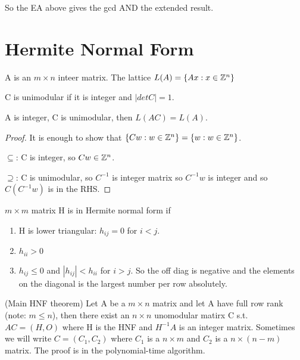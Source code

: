 So the EA above gives the gcd AND the extended result.

\section{Hermite Normal Form}


\begin{definition}
A is an $m\times n$ inteer matrix. The lattice $L(A) = \{Ax : x \in \mathbb Z^n\}$
\end{definition}
 
\begin{definition}
C is unimodular if it is integer and $|det C| = 1$.
\end{definition}


\begin{lemma}
A is integer, C is unimodular, then $L(AC) = L(A)$.
\end{lemma}
\begin{proof}
It is enough to show that $\{Cw : w \in \mathbb Z^n\} = \{w: w \in \mathbb Z^n\}$. 

$\subseteq$: C is integer, so $Cw \in \mathbb Z^n$.

$\supseteq$: C is unimodular, so $C^{-1}$ is integer matrix so $C^{-1}w$ is integer and so $C(C^{-1}w)$ is in the RHS.
\end{proof}

\begin{definition}
$m \times m$ matrix H is in Hermite normal form if 
\begin{enumerate}
	\item H is lower triangular: $h_{ij} = 0 $ for $i < j$.
	\item $h_{ii} > 0$
	\item $h_{ij} \leq 0$ and $|h_{ij}| < h_{ii}$ for $i>j$. So the off diag is negative and the elements on the diagonal is the largest number per row absolutely. 
\end{enumerate}
\end{definition}


\begin{theorem}(Main HNF theorem)
Let A be a $m \times n$ matrix and let A have full row rank (note: $m \leq n$), then there exist an $n \times n$ unomodular matirx C s.t.  $AC  = (H, O)$ where H is the HNF and $H^{-1}A$ is an integer matrix.  Sometimes we will write $C = (C_1, C_2)$ where $C_1$ is a $n \times m$ and $C_2$ is a $n\times (n-m)$ matrix. The proof is in the polynomial-time algorithm.
\end{theorem}


